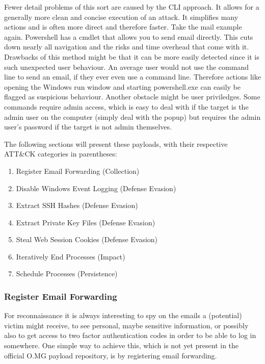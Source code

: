 Fewer detail problems of this sort are caused by the CLI approach. It allows for a generally more clean and concise execution of an attack. It simplifies many actions and is often more direct and therefore faster. Take the mail example again. Powershell has a cmdlet that allows you to send email directly. This cuts down nearly all navigation and the risks and time overhead that come with it. \\
Drawbacks of this method might be that it can be more easily detected since it is such unexpected user behaviour. An average user would not use the command line to send an email, if they ever even use a command line. Therefore actions like opening the Windows run window and starting powershell.exe can easily be flagged as suspicious behaviour. Another obstacle might be user priviledges. Some commands require admin access, which is easy to deal with if the target is the admin user on the computer (simply deal with the popup) but requires the admin user's password if the target is not admin themselves. 


The following sections will present these payloads, with their respective ATT&CK categories in parentheses:
\begin{enumerate}
    \item Register Email Forwarding (Collection)
    \item Disable Windows Event Logging (Defense Evasion)
    \item Extract SSH Hashes (Defense Evasion)
    \item Extract Private Key Files (Defense Evasion)
    \item Steal Web Session Cookies (Defense Evasion)
    \item Iteratively End Processes (Impact)
    \item Schedule Processes (Persistence)
\end{enumerate}





\subsubsection{Register Email Forwarding}

For reconnaissance it is always interesting to spy on the emails a (potential) victim might receive, to see personal, maybe sensitive information, or possibly also to get access to two factor authentication codes in order to be able to log in somewhere. One simple way to achieve this, which is not yet present in the official O.MG payload repository, is by registering email forwarding. 



